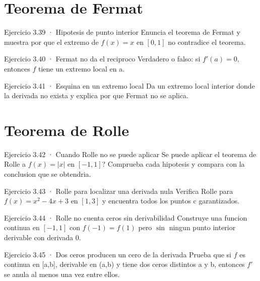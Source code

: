 \documentclass[10pt,a4paper,oneside,openany]{book}
\begin{document}
\section{Teorema de Fermat}
\begin{PSevenExerciseFixed}{Ejercicio 3.39 · Hipotesis de punto interior}
Enuncia el teorema de Fermat y muestra por que el extremo de \(f(x)=x\) en \([0,1]\) no contradice el teorema.
\end{PSevenExerciseFixed}
\begin{PSevenExerciseFixed}{Ejercicio 3.40 · Fermat no da el reciproco}
Verdadero o falso: si \(f'(a)=0,\) entonces \(f\) tiene un extremo local en a.
\end{PSevenExerciseFixed}
\begin{PSevenExerciseFixed}{Ejercicio 3.41 · Esquina en un extremo local}
Da un extremo local interior donde la derivada no exista y explica por que Fermat no se aplica.
\end{PSevenExerciseFixed}
\section{Teorema de Rolle}
\begin{PSevenExerciseFixed}{Ejercicio 3.42 · Cuando Rolle no se puede aplicar}
Se puede aplicar el teorema de Rolle a \(f(x)=|x|\) en \([-1,1]\)? Comprueba cada hipotesis y compara con la conclusion que se obtendria.
\end{PSevenExerciseFixed}
\begin{PSevenExerciseFixed}{Ejercicio 3.43 · Rolle para localizar una derivada nula}
Verifica Rolle para \(f(x)=x^{2}-4x+3\) en \([1,3]\) y encuentra todos los puntos c garantizados.
\end{PSevenExerciseFixed}
\begin{PSevenExerciseFixed}{Ejercicio 3.44 · Rolle no cuenta ceros sin derivabilidad}
Construye una funcion continua en \([-1,1]\) con \(f(-1)=f(1)\) pero \(\sin\) ningun punto interior derivable con derivada \(0\).
\end{PSevenExerciseFixed}
\begin{PSevenExerciseFixed}{Ejercicio 3.45 · Dos ceros producen un cero de la derivada}
Prueba que si \(f\) es continua en [a,b], derivable en (a,b) y tiene dos ceros distintos a y b, entonces \(f'\) se anula al menos una vez entre ellos.
\end{PSevenExerciseFixed}
\end{document}
